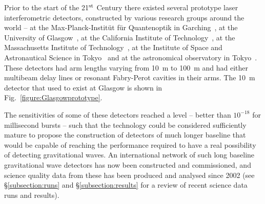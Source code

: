 \documentclass{article}
\begin{document}
Prior to the start of the 21$^{\rm st}$ Century there existed several prototype
laser interferometric detectors, constructed by various research groups around
the world -- at the Max-Planck-Instit\"ut f\"ur Quantenoptik in
Garching~\cite{Shoemaker}, at the University of Glasgow~\cite{Robertson}, at the
California Institute of Technology~\cite{Abramovici}, at the Massachusetts
Institute of Technology~\cite{Fritschel2}, at the Institute of Space and
Astronautical Science in Tokyo~\cite{Mizuno} and at the astronomical observatory
in Tokyo~\cite{Araya}. These detectors had arm lengths varying from 10~m to
100~m and had either multibeam delay lines or resonant Fabry-Perot cavities in
their arms.  The 10~m detector that used to exist at Glasgow is shown in
Fig.~\ref{figure:Glasgowprototype}.


The sensitivities of some of these detectors reached a level -- better than
$10^{-18}$ for millisecond bursts -- such that the technology could be
considered sufficiently mature to propose the construction of detectors of much
longer baseline that would be capable of reaching the performance required to
have a real possibility of detecting gravitational waves.  An international
network of such long baseline gravitational wave detectors has now been
constructed and commissioned, and science quality data from these has been
produced and analysed since 2002 (see \S\ref{subsection:runs} and
\S\ref{subsection:results} for a review of recent science data runs and results).
\end{document}
